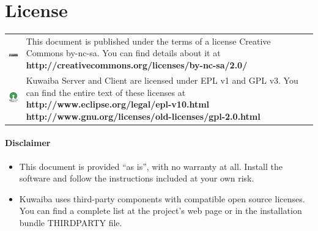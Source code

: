 \documentclass[a4paper]{article}
\begin{document}
	\clearpage
	\section{License}
		\begin{table}[ht]
			\centering
			\begin{tabular}{cp{10cm}}
				
				\includegraphics[]{img/cc_license_logo.jpg} & This document is published under the terms of a license Creative Commons by-nc-sa. You can find details about it at\linebreak
				\textbf{http://creativecommons.org/licenses/by-nc-sa/2.0/ } \\

				\includegraphics[width=2cm]{img/osi_logo.jpg} & Kuwaiba Server and Client are licensed under EPL v1 and GPL v3. You can find the entire text of these licenses at \linebreak
				\textbf{http://www.eclipse.org/legal/epl-v10.html} \linebreak
				\textbf{http://www.gnu.org/licenses/old-licenses/gpl-2.0.html} \\
			\end{tabular}
		\end{table}
		\paragraph{Disclaimer} \hspace{0pt}
		\begin{itemize}
			
			
			\item This document is provided “as is”, with no warranty at all. Install the software and follow the instructions included at your own risk.
			
			\item Kuwaiba uses third-party components with compatible open source licenses. You can find a complete list at the project's web page or in the installation bundle THIRDPARTY file.
		\end{itemize}
	
\end{document}
